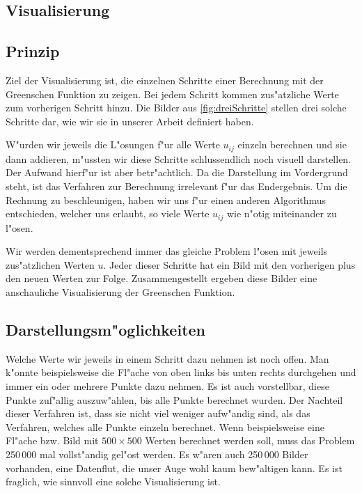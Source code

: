 \begin{refsection}
\section{Visualisierung}
	
\subsection{Prinzip}
			
Ziel der Visualisierung ist, die einzelnen Schritte einer Berechnung
mit der Greenschen Funktion zu zeigen. Bei jedem Schritt kommen
zus"atzliche Werte zum vorherigen Schritt hinzu. Die Bilder aus
\ref{fig:dreiSchritte} stellen drei solche Schritte dar, wie wir
sie in unserer Arbeit definiert haben.
		
W"urden wir jeweils die L"osungen f"ur alle Werte $u_{ij}$ einzeln
berechnen und sie dann addieren, m"ussten wir diese Schritte
schlussendlich noch visuell darstellen. Der Aufwand hierf"ur ist
aber betr"achtlich. Da die Darstellung im Vordergrund steht, ist das Verfahren zur
Berechnung irrelevant f"ur das Endergebnis. Um die Rechnung zu
beschleunigen, haben wir uns f"ur einen anderen Algorithmus
entschieden, welcher uns erlaubt, so viele Werte $u_{ij}$ wie n"otig
miteinander zu l"osen.
		
Wir werden dementsprechend immer das gleiche Problem l"osen mit
jeweils zus"atzlichen Werten $u$. Jeder dieser Schritte hat ein
Bild mit den vorherigen plus den neuen Werten zur Folge. Zusammengestellt
ergeben diese Bilder eine anschauliche Visualisierung der Greenschen
Funktion.
	
	
\subsection{Darstellungsm"oglichkeiten}
	
Welche Werte wir jeweils in einem Schritt dazu nehmen ist noch
offen. Man k"onnte beispielsweise die Fl"ache von oben links bis
unten rechts durchgehen und immer ein oder mehrere Punkte dazu
nehmen. Es ist auch vorstellbar, diese Punkte zuf"allig auszuw"ahlen,
bis alle Punkte berechnet wurden. Der Nachteil dieser Verfahren
ist, dass sie nicht viel weniger aufw"andig sind, als das Verfahren,
welches alle Punkte einzeln berechnet. Wenn beispielsweise eine
Fl"ache bzw. Bild mit $500 \times 500$ Werten berechnet werden soll,
muss das Problem 250\,000 mal vollst"andig gel"ost werden. Es w"aren
auch 250\,000 Bilder vorhanden, eine Datenflut, die unser Auge wohl
kaum bew"altigen kann. Es ist fraglich, wie sinnvoll eine solche
Visualisierung ist.
		

\end{refsection}
